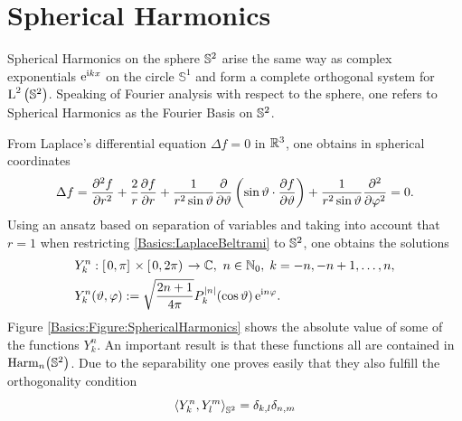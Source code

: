 \section{Spherical Harmonics}
\label{Basics:SphericalHarmonics}

Spherical Harmonics on the sphere $\mathbb{S}^2$ arise the same way as complex exponentials 
$\mbox{\rm{e}}^{\mbox{\scriptsize\rm{i}} k x}$ on the circle $\mathbb{S}^1$ and form a complete orthogonal system for $\text{\rm{L}}^{2}\left(\mathbb{S}^2\right)$.
Speaking of Fourier analysis with respect to the sphere, one refers to Spherical Harmonics as the Fourier 
Basis on $\mathbb{S}^2$. 

From Laplace's differential equation $\Delta f = 0$ in $\mathbb{R}^3$, one obtains in spherical coordinates
\begin{equation}
  \label{Basics:LaplaceBeltrami}
  \Delta f = \frac{\partial^2 f}{\partial r^2} + \frac{2}{r}\frac{\partial f}{\partial
  r} + \frac{1}{r^2 \sin \vartheta}\frac{\partial}{\partial \vartheta}\left(\sin \vartheta \cdot \frac{\partial f}{\partial
  \vartheta}\right) + \frac{1}{r^2 \sin \vartheta}\frac{\partial^2}{\partial \varphi^2} = 0.
\end{equation}
Using an ansatz based on separation of variables and taking into account that $r = 1$ when restricting 
\eqref{Basics:LaplaceBeltrami} to $\mathbb{S}^2$, one obtains the solutions
\begin{equation}
  \label{Basics:SphericalHarmonicsDefinition}
  \begin{split}
    & Y_{k}^n: \left[\left.0,\pi\right]\right.\times\left[\left.0,2\pi\right)\right. \rightarrow
    \mathbb{C},\ n \in \mathbb{N}_{0},\; k = -n,-n+1,\ldots,n,\\
    & Y_{k}^n{\hspace{-0.4ex}}\left(\vartheta,\varphi\right) := \sqrt{\frac{2n+1}{4\pi}} 
    P_{k}^{\left\vert n\right\vert}{\hspace{-0.4ex}}\left(\cos \vartheta\right) \mbox{\rm{e}}^{\mbox{\scriptsize\rm{i}} n \varphi}.
  \end{split}
\end{equation}
Figure \ref{Basics:Figure:SphericalHarmonics} shows the absolute value of some of the 
functions $Y_{k}^{n}$. An important result is that these functions all are contained in $\text{Harm}_n{\hspace{-0.4ex}}\left(\mathbb{S}^2\right)$.
Due to the separability one proves easily that they also fulfill the orthogonality condition
\begin{equation}
  \nonumber
  \left<Y_{k}^n,Y_{l}^m\right>_{\mathbb{S}^2} = \delta_{k,l} \delta_{n,m}
\end{equation}
